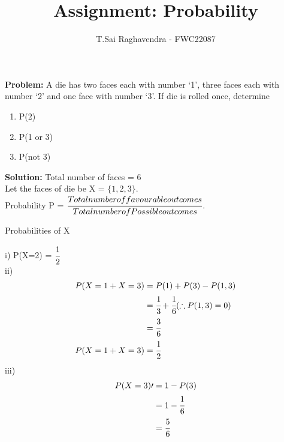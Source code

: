 \documentclass{article}
\newcommand{\Problem}{\noindent \textbf{Problem: }}
\newcommand{\solution}{\noindent \textbf{Solution: }}
\begin{document}
\title{Assignment: Probability}
\author{\Large T.Sai Raghavendra - FWC22087}
\date{}


\maketitle

\Problem A die has two faces each with number ‘1’, three faces each with number ‘2’ and
one face with number ‘3’. If die is rolled once, determine
\begin{enumerate}
\item P(2)
\item P(1 or 3)
\item P(not 3)
\end{enumerate}

\solution
Total number of faces = 6\\
Let the faces of die be X = $\{1,2,3\}$.\\
Probability P = $\cfrac{Total number of favourable outcomes}{Total number of Possible outcomes}$.

	\begin{table}[h!]
	\small
	\centering
	
	\caption{Probabilities of X}
	\label{tables:table1}
	\end{table}
i) P(X=2) = $\cfrac{1}{2}$\\  %
	
ii) 
\begin{align}
P(X=1 + X=3)	=& \; P(1) + P(3) - P(1,3)\\
				=& \; \cfrac{1}{3} + \cfrac{1}{6}   (\therefore P(1,3) = 0)\\
				=& \; \cfrac{3}{6}\\
P(X=1 + X=3) 	=& \; \cfrac{1}{2}
\end{align}
iii)
\begin{align}
P(X=3)\prime =& \; 1 - P(3)\\
			 =& \; 1 - \cfrac{1}{6}\\
			 =& \; \cfrac{5}{6}
\end{align}
\end{document}
